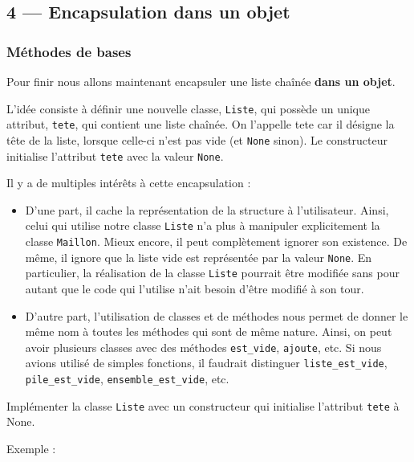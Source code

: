 \documentclass[a4paper,17pt]{extarticle}
\providecommand{\tightlist}{%
      \setlength{\itemsep}{0pt}\setlength{\parskip}{0pt}}
\begin{document}
    \hypertarget{encapsulation-dans-un-objet}{%
\subsection{4 --- Encapsulation dans un
objet}\label{encapsulation-dans-un-objet}}

    \hypertarget{muxe9thodes-de-bases}{%
\subsubsection{Méthodes de bases}\label{muxe9thodes-de-bases}}

    Pour finir nous allons maintenant encapsuler une liste chaînée
\textbf{dans un objet}.

L'idée consiste à définir une nouvelle classe, \texttt{Liste}, qui
possède un unique attribut, \texttt{tete}, qui contient une liste
chaînée. On l'appelle tete car il désigne la tête de la liste, lorsque
celle-ci n'est pas vide (et \texttt{None} sinon). Le constructeur
initialise l'attribut \texttt{tete} avec la valeur \texttt{None}.

    Il y a de multiples intérêts à cette encapsulation :

\begin{itemize}
\tightlist
\item
  D'une part, il cache la représentation de la structure à
  l'utilisateur. Ainsi, celui qui utilise notre classe \texttt{Liste}
  n'a plus à manipuler explicitement la classe \texttt{Maillon}. Mieux
  encore, il peut complètement ignorer son existence. De même, il ignore
  que la liste vide est représentée par la valeur \texttt{None}. En
  particulier, la réalisation de la classe \texttt{Liste} pourrait être
  modifiée sans pour autant que le code qui l'utilise n'ait besoin
  d'être modifié à son tour.
\item
  D'autre part, l'utilisation de classes et de méthodes nous permet de
  donner le même nom à toutes les méthodes qui sont de même nature.
  Ainsi, on peut avoir plusieurs classes avec des méthodes
  \texttt{est\_vide}, \texttt{ajoute}, etc. Si nous avions utilisé de
  simples fonctions, il faudrait distinguer \texttt{liste\_est\_vide},
  \texttt{pile\_est\_vide}, \texttt{ensemble\_est\_vide}, etc.
\end{itemize}

    Implémenter la classe \texttt{Liste} avec un constructeur qui initialise
l'attribut \texttt{tete} à None.

Exemple :
\end{document}

